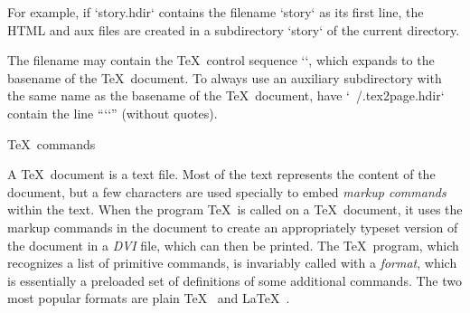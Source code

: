 For example, if `story.hdir` contains the filename
`story` as its first line, the HTML and aux files are
created in a subdirectory `story` of the
current directory.


The filename may contain the \TeX\ control sequence
`\jobname`, which expands to the basename of
the \TeX\ document.  To always use an auxiliary
subdirectory with the same name as the basename of the
\TeX\ document, have `~/.tex2page.hdir` contain the
line “`\jobname`” (without quotes).

  \TeX\ commands

 
%
A \TeX\ document is a text file.  Most of the text
represents the content of the document, but a few
characters are used specially to embed {\em markup
commands} within the text.  When
the program \TeX\ is called on a \TeX\
document, it uses the markup commands in the document
to create an appropriately typeset version of the
document in a {\em DVI} file, which can then be
printed.  The \TeX\ program, which
recognizes a list of primitive commands, is invariably
called with a {\em format}, which is essentially a
preloaded set of definitions of some additional
commands.  The two most popular formats
are plain \TeX~\cite{texbook} and
\LaTeX~\cite{latex,latex-companion}.

